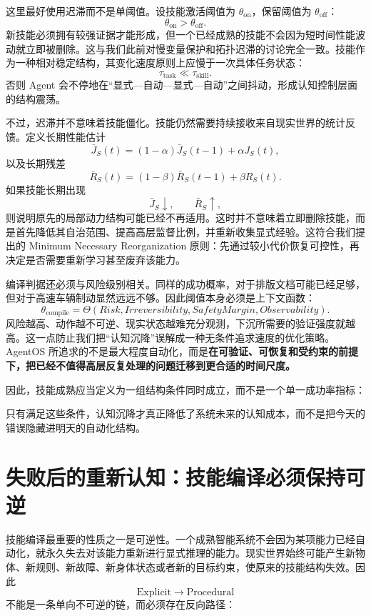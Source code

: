 这里最好使用迟滞而不是单阈值。设技能激活阈值为 $\theta_{\mathrm{on}}$，保留阈值为 $\theta_{\mathrm{off}}$：
\[
\theta_{\mathrm{on}}
>
\theta_{\mathrm{off}}.
\]
新技能必须拥有较强证据才能形成，但一个已经成熟的技能不会因为短时间性能波动就立即被删除。这与我们此前对慢变量保护和拓扑迟滞的讨论完全一致。技能作为一种相对稳定结构，其变化速度原则上应慢于一次具体任务状态：
\[
\tau_{\mathrm{task}}
\ll
\tau_{\mathrm{skill}}.
\]
否则 Agent 会不停地在“显式—自动—显式—自动”之间抖动，形成认知控制层面的结构震荡。

不过，迟滞并不意味着技能僵化。技能仍然需要持续接收来自现实世界的统计反馈。定义长期性能估计
\[
\bar J_S(t)
=
(1-\alpha)\bar J_S(t-1)
+
\alpha J_S(t),
\]
以及长期残差
\[
\bar R_S(t)
=
(1-\beta)\bar R_S(t-1)
+
\beta R_S(t).
\]
如果技能长期出现
\[
\bar J_S\downarrow,
\qquad
\bar R_S\uparrow,
\]
则说明原先的局部动力结构可能已经不再适用。这时并不意味着立即删除技能，而是首先降低其自治范围、提高高层监督比例，并重新收集显式经验。这符合我们提出的 Minimum Necessary Reorganization 原则：先通过较小代价恢复可控性，再决定是否需要重新学习甚至废弃该能力。

编译判据还必须与风险级别相关。同样的成功概率，对于排版文档可能已经足够，但对于高速车辆制动显然远远不够。因此阈值本身必须是上下文函数：
\[
\theta_{\mathrm{compile}}
=
\Theta
\left(
Risk,
Irreversibility,
SafetyMargin,
Observability
\right).
\]
风险越高、动作越不可逆、现实状态越难充分观测，下沉所需要的验证强度就越高。这一点防止我们把“认知沉降”误解成一种无条件追求速度的优化策略。AgentOS 所追求的不是最大程度自动化，而是\textbf{在可验证、可恢复和受约束的前提下，把已经不值得高层反复处理的问题迁移到更合适的时间尺度。}

因此，技能成熟应当定义为一组结构条件同时成立，而不是一个单一成功率指标：
\begin{statementbox}
\centering
{}
\end{statementbox}
只有满足这些条件，认知沉降才真正降低了系统未来的认知成本，而不是把今天的错误隐藏进明天的自动化结构。

\section{失败后的重新认知：技能编译必须保持可逆}

技能编译最重要的性质之一是可逆性。一个成熟智能系统不会因为某项能力已经自动化，就永久失去对该能力重新进行显式推理的能力。现实世界始终可能产生新物体、新规则、新故障、新身体状态或者新的目标约束，使原来的技能结构失效。因此
\[
\mathrm{Explicit}
\rightarrow
\mathrm{Procedural}
\]
不能是一条单向不可逆的链，而必须存在反向路径：
\begin{statementbox}
\centering
{}
\end{statementbox}

